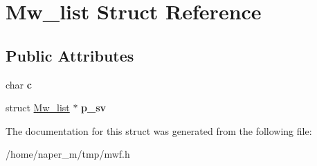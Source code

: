 \hypertarget{struct_mw__list}{\section{Mw\-\_\-list Struct Reference}
\label{struct_mw__list}
}
\subsection*{Public Attributes}
\begin{DoxyCompactItemize}
\item 
\hypertarget{struct_mw__list_a2d8ef0b21644162457d61f733eaf9865}{char {\bfseries c}}\label{struct_mw__list_a2d8ef0b21644162457d61f733eaf9865}

\item 
\hypertarget{struct_mw__list_ab1f55ebc803b0e3031bf1c65fa4f249d}{struct \hyperlink{struct_mw__list}{Mw\-\_\-list} $\ast$ {\bfseries p\-\_\-sv}}\label{struct_mw__list_ab1f55ebc803b0e3031bf1c65fa4f249d}

\end{DoxyCompactItemize}


The documentation for this struct was generated from the following file\-:\begin{DoxyCompactItemize}
\item 
/home/naper\-\_\-m/tmp/mwf.\-h\end{DoxyCompactItemize}
